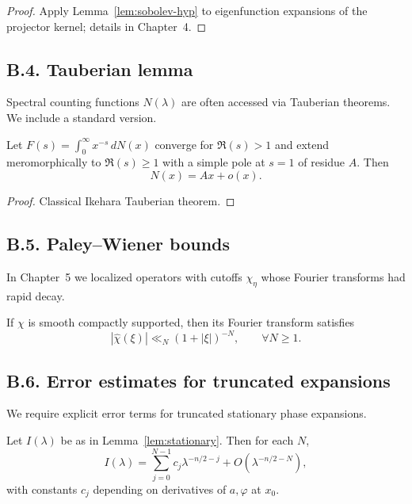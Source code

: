 \begin{proof}
Apply Lemma~\ref{lem:sobolev-hyp} to eigenfunction expansions of the projector
kernel; details in Chapter~4.
\end{proof}

\subsection*{B.4. Tauberian lemma}

\noindent
Spectral counting functions $N(\lambda)$ are often accessed via Tauberian
theorems. We include a standard version.

\begin{lemma}\label{lem:tauber}
Let $F(s)=\int_0^\infty x^{-s}\,dN(x)$ converge for $\Re(s)>1$ and extend
meromorphically to $\Re(s)\ge 1$ with a simple pole at $s=1$ of residue $A$.
Then
\[
N(x) = Ax + o(x).
\]
\end{lemma}

\begin{proof}
Classical Ikehara Tauberian theorem.
\end{proof}

\subsection*{B.5. Paley–Wiener bounds}

\noindent
In Chapter~5 we localized operators with cutoffs $\chi_\eta$ whose Fourier
transforms had rapid decay.

\begin{lemma}\label{lem:paley}
If $\chi$ is smooth compactly supported, then its Fourier transform satisfies
\[
|\hat{\chi}(\xi)| \ll_N (1+|\xi|)^{-N},\qquad \forall N\ge 1.
\]
\end{lemma}

\subsection*{B.6. Error estimates for truncated expansions}

\noindent
We require explicit error terms for truncated stationary phase expansions.

\begin{proposition}\label{prop:stationary-error}
Let $I(\lambda)$ be as in Lemma~\ref{lem:stationary}. Then for each $N$,
\[
I(\lambda) = \sum_{j=0}^{N-1} c_j \lambda^{-n/2-j} + O(\lambda^{-n/2-N}),
\]
with constants $c_j$ depending on derivatives of $a,\varphi$ at $x_0$.
\end{proposition}

